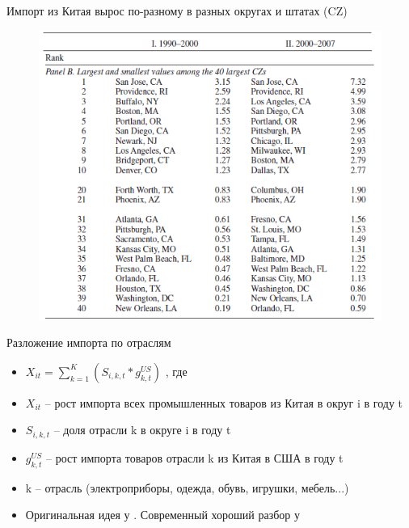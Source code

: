 \begin{frame}{Импорт из Китая вырос по-разному в разных округах и штатах (CZ)}
 \begin{figure}
 \centering
       \includegraphics[width=\textwidth]{Lecture_Sources/Images/Bartik_differences.png}
  \end{figure}
\end{frame}

\begin{frame}{Разложение импорта по отраслям \parencite{}}
    \begin{itemize}
      \item$X_{it}=\sum\limits_{k=1}^K(S_{i,k,t}*g_{k,t}^{US})$ , где
      \item $X_{it}$ -- рост импорта всех промышленных товаров из Китая в округ i в году t
      \item $S_{i,k,t}$ -- доля отрасли k в округе i в году t
      \item $g_{k,t}^{US}$ --  рост импорта товаров отрасли k из Китая в США в году t
      \item k -- отрасль (электроприборы, одежда, обувь, игрушки, мебель...)
      \item Оригинальная идея у \textcite{bartik1991benefits}. Современный хороший разбор у \textcite{goldsmith2018bartik}
  \end{itemize}
\end{frame}

